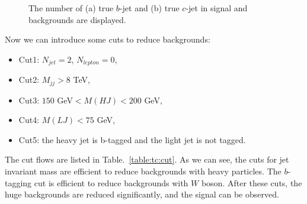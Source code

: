 \documentclass[a4paper,11pt]{article}
\begin{document}
\begin{figure}[htbp]
  \setcounter{subfigure}{0}
  \centering
  \caption{The number of (a) true $b$-jet and (b) true $c$-jet in signal and backgrounds are displayed.}\label{fig:bcjet}
\end{figure}

Now we can introduce some cuts to reduce backgrounds:
\begin{itemize}
  \item Cut1: $N_{jet}=2$, $N_{lepton}=0$,
  \item Cut2: $M_{jj}>8$ TeV,
  \item Cut3: $150$ GeV$<M(HJ)<200$ GeV,
  \item Cut4: $M(LJ)<75$ GeV,
  \item Cut5: the heavy jet is b-tagged and the light jet is not tagged.
\end{itemize}
The cut flows are listed in Table.~\ref{table:tc:cut}. 
As we can see, the cuts for jet invariant mass are efficient to reduce backgrounds with heavy particles. 
The $b$-tagging cut is efficient to reduce backgrounds with $W$ boson. 
After these cuts, the huge backgrounds are reduced significantly, 
and the signal can be observed. 
\end{document}
